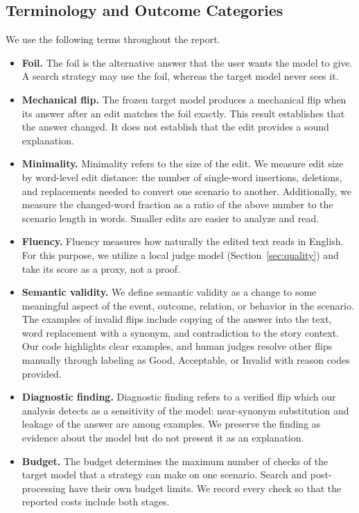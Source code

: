 \documentclass[11pt,a4paper]{article}
\begin{document}
\subsection{Terminology and Outcome Categories}
\label{sec:terms}

We use the following terms throughout the report.

\begin{itemize}
  \item \textbf{Foil.} The foil is the alternative answer that the user wants the
  model to give. A search strategy may use the foil, whereas the target model never
  sees it.
  \item \textbf{Mechanical flip.} The frozen target model produces a mechanical flip
  when its answer after an edit matches the foil exactly. This result establishes
  that the answer changed. It does not establish that the edit provides a sound
  explanation.
  \item \textbf{Minimality.} Minimality refers to the size of the edit. We measure edit
  size by word-level edit distance: the number of single-word insertions, deletions,
  and replacements needed to convert one scenario to another. Additionally, we
  measure the changed-word fraction as a ratio of the above number to the scenario
  length in words. Smaller edits are easier to analyze and read.
  \item \textbf{Fluency.} Fluency measures how naturally the edited text reads in
  English. For this purpose, we utilize a local judge model
  (Section~\ref{sec:quality}) and take its score as a proxy, not a proof.
  \item \textbf{Semantic validity.} We define semantic validity as a change to some
  meaningful aspect of the event, outcome, relation, or behavior in the scenario. The
  examples of invalid flips include copying of the answer into the text, word
  replacement with a synonym, and contradiction to the story context. Our code
  highlights clear examples, and human judges resolve other flips manually through
  labeling as Good, Acceptable, or Invalid with reason codes provided.
  \item \textbf{Diagnostic finding.} Diagnostic finding refers to a verified flip
  which our analysis detects as a sensitivity of the model: near-synonym substitution
  and leakage of the answer are among examples. We preserve the finding as evidence
  about the model but do not present it as an explanation.
  \item \textbf{Budget.} The budget determines the maximum number of checks of the
  target model that a strategy can make on one scenario. Search and post-processing
  have their own budget limits. We record every check so that the reported costs
  include both stages.
\end{itemize}
\end{document}
